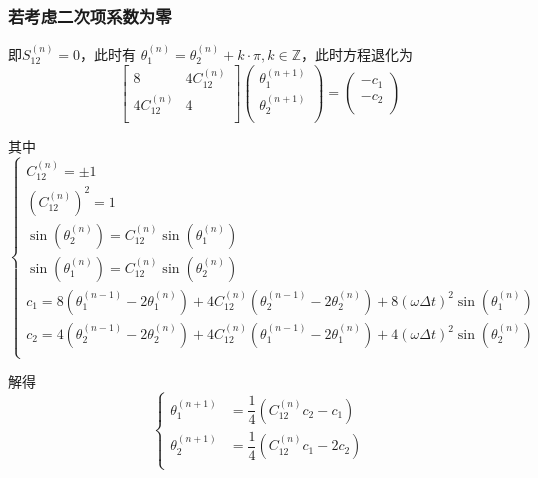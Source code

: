 \documentclass[UTF8]{ctexart}
\begin{document}
			\subsubsection{若考虑二次项系数为零}
				即$S_{12}^{(n)} = 0$，此时有 $\theta_{1}^{(n)} = \theta_{2}^{(n)} + k \cdot \pi, k \in \mathbb{Z}$，此时方程退化为
				\begin{equation}
					\left[
						\begin{matrix}
							8              & 4 C_{12}^{(n)}    \\
							4 C_{12}^{(n)} & 4                 \\
						\end{matrix}
					\right]
					\left(
						\begin{matrix}
							\theta_{1}^{(n + 1)}         \\
							\theta_{2}^{(n + 1)}         \\
						\end{matrix}
					\right)
					= 
					\left(
						\begin{matrix}
							-c_1    \\
							-c_2    \\
						\end{matrix}
					\right)
				\end{equation}

				其中
				\begin{equation}
					\begin{cases}
						C_{12}^{(n)}     = \pm 1 \\
						\left(C_{12}^{(n)}\right)^{2} =     1 \\
						\sin\left(\theta_{2}^{(n)}\right) = C_{12}^{(n)}\sin\left(\theta_{1}^{(n)}\right)  \\
						\sin\left(\theta_{1}^{(n)}\right) = C_{12}^{(n)}\sin\left(\theta_{2}^{(n)}\right)  \\
						c_{1} = 8 \left(\theta_{1}^{(n - 1)} - 2 \theta_{1}^{(n)}\right) + 4 C_{12}^{(n)} \left(\theta_{2}^{(n - 1)} - 2 \theta_{2}^{(n)}\right) + 8 \left(\omega \Delta t\right)^{2} \sin\left(\theta_{1}^{(n)}\right)    \\
						c_{2} = 4 \left(\theta_{2}^{(n - 1)} - 2 \theta_{2}^{(n)}\right) + 4 C_{12}^{(n)} \left(\theta_{1}^{(n - 1)} - 2 \theta_{1}^{(n)}\right) + 4 \left(\omega \Delta t\right)^{2} \sin\left(\theta_{2}^{(n)}\right)    \\
					\end{cases}
				\end{equation}

				解得
				\begin{equation}
					\begin{cases}
						\theta_{1}^{(n + 1)} & = \dfrac{1}{4}(C_{12}^{(n)} c_{2} -   c_{1})    \\
						\theta_{2}^{(n + 1)} & = \dfrac{1}{4}(C_{12}^{(n)} c_{1} - 2 c_{2})    \\
					\end{cases}
				\end{equation}
				
\end{document}
